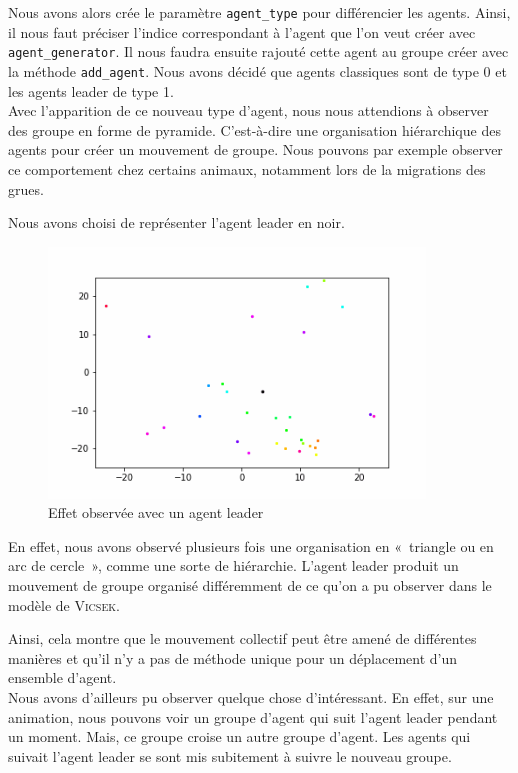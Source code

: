 \documentclass[french, a4paper, 12pt, openany]{report}
\begin{document}
       Nous avons alors crée le paramètre \verb|agent_type| pour différencier les agents. Ainsi, il nous faut préciser l'indice correspondant à l'agent que l'on veut créer avec \verb|agent_generator|. Il nous faudra ensuite rajouté cette agent au groupe créer avec la méthode \verb|add_agent|. Nous avons décidé que agents classiques sont de type 0 et les agents leader de type 1.\\
       
       Avec l'apparition de ce nouveau type d'agent, nous nous attendions à observer des groupe en forme de pyramide. C'est-à-dire une organisation hiérarchique des agents pour créer un mouvement de groupe. Nous pouvons par exemple observer ce comportement chez certains animaux, notamment lors de la migrations des grues. 
       
   Nous avons choisi de représenter l'agent leader en noir.
   \begin{figure}[!h]
		\centering
		\includegraphics[width=10cm]{images/image_15.png}
		\caption{Effet observée avec un agent leader}
		\label{leader}
	\end{figure}  
	
	   En effet, nous avons observé plusieurs fois une organisation en «~triangle ou en arc de cercle~», comme une sorte de hiérarchie. L'agent leader produit un mouvement de groupe organisé différemment de ce qu'on a pu observer dans le modèle de \textsc{Vicsek}.
	   
	   Ainsi, cela montre que le mouvement collectif peut être amené de différentes manières et qu'il n'y a pas de méthode unique pour un déplacement d'un ensemble d'agent.\\
    
  
       Nous avons d'ailleurs pu observer quelque chose d'intéressant. En effet, sur une animation, nous pouvons voir un groupe d'agent qui suit l'agent leader pendant un moment. Mais, ce groupe croise un autre groupe d'agent. Les agents qui suivait l'agent leader se sont mis subitement à suivre le nouveau groupe. 
       
\end{document}
